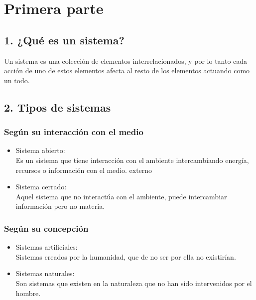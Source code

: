 \documentclass[a4paper,man,natbib]{apa6}
\begin{document}


\section{Primera parte}
\subsection{1. ¿Qué es un sistema?}
Un sistema es una colección de elementos interrelacionados, y por lo tanto cada acción de uno de estos elementos afecta al resto de los elementos actuando como un todo. \citep{von1976teoria}


\subsection{2. Tipos de sistemas}
\subsubsection{Según su interacción con el medio}
\begin{itemize}
    \item Sistema abierto:\\
          Es un sistema que tiene interacción con el ambiente intercambiando energía, recursos o información con el medio. externo\citep{10.2307/j.ctv1228hsw}
    \item Sistema cerrado:\\
          Aquel sistema que no interactúa con el ambiente, puede intercambiar información pero no materia. \citep{10.2307/j.ctv1228hsw}
\end{itemize}

\subsubsection{Según su concepción}
\begin{itemize}
    \item Sistemas artificiales:\\
          Sistemas creados por la humanidad, que de no ser por ella no existirían. \citep{10.2307/j.ctv1228hsw}
    \item Sistemas naturales:\\
          Son sistemas que existen en la naturaleza que no han sido intervenidos por el hombre.
\end{itemize}
\end{document}

